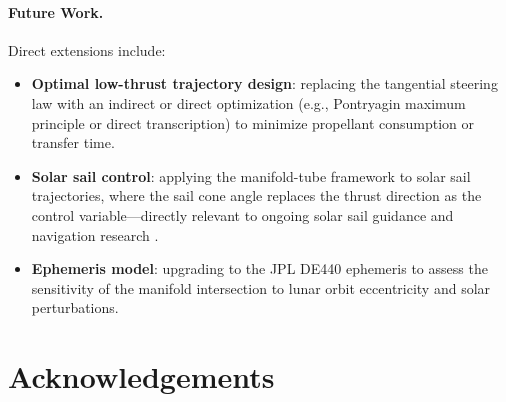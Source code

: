 \documentclass[12pt, a4paper]{article}
\begin{document}
\paragraph{Future Work.}
Direct extensions include:
\begin{itemize}
  \item \textbf{Optimal low-thrust trajectory design}: replacing the
    tangential steering law with an indirect or direct optimization
    (e.g., Pontryagin maximum principle or direct transcription) to
    minimize propellant consumption or transfer time.
  \item \textbf{Solar sail control}: applying the manifold-tube framework
    to solar sail trajectories, where the sail cone angle replaces the
    thrust direction as the control variable---directly relevant to
    ongoing solar sail guidance and navigation research \citep{Chujo2020}.
  \item \textbf{Ephemeris model}: upgrading to the JPL DE440 ephemeris to
    assess the sensitivity of the manifold intersection to lunar orbit
    eccentricity and solar perturbations.
\end{itemize}

\section*{Acknowledgements}



\end{document}

